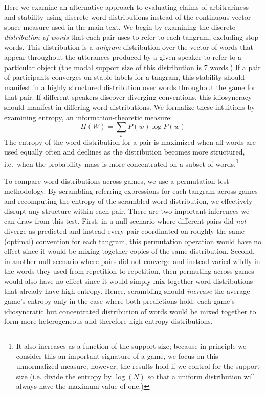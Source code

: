 \documentclass[alpha-refs]{wiley-article}
\begin{document}
Here we examine an alternative approach to evaluating claims of arbitrariness
 and stability using discrete word distributions instead of the continuous vector space measure used in the main text.
We begin by examining the discrete \emph{distribution of words} that each pair uses to refer to each tangram, excluding stop words.
This distribution is a \emph{unigram} distribution over the vector of words that appear throughout the utterances produced by a given speaker to refer to a particular object (the modal support size of this distribution is 7 words.)
If a pair of participants converges on stable labels for a tangram, this stability should manifest in a highly structured distribution over words throughout the game for that pair.
If different speakers discover diverging conventions, this idiosyncracy should manifest in differing word distributions.
We formalize these intuitions by examining entropy, an information-theoretic measure: $$H(W) = \sum_w P(w) \log P(w)$$
The entropy of the word distribution for a pair is maximized when all words are used equally often and declines as the distribution becomes more structured, i.e.~when the probability mass is more concentrated on a subset of words.\footnote{It also increases as a function of the support size; because in principle we consider this an important signature of a game, we focus on this unnormalized measure; however, the results hold if we control for the support size (i.e. divide the entropy by $\log(N)$ so that a uniform distribution will always have the maximum value of one.)}

To compare word distributions across games, we use a permutation test methodology.
By scrambling referring expressions for each tangram across games and recomputing the entropy of the scrambled word distribution, we effectively disrupt any structure within each pair.
There are two important inferences we can draw from this test.
First, in a null scenario where different pairs did \emph{not} diverge as predicted and instead every pair coordinated on roughly the same (optimal) convention for each tangram, this permutation operation would have no effect since it would be mixing together copies of the same distribution.
Second, in another null scenario where pairs did not converge and instead varied wildly in the words they used from repetition to repetition, then permuting across games would also have no effect since it would simply mix together word distributions that already have high entropy.
Hence, scrambling should \emph{increase} the average game's entropy only in the case where both predictions hold: each game's idiosyncratic but concentrated distribution of words would be mixed together to form more heterogeneous and therefore high-entropy distributions.
\end{document}
